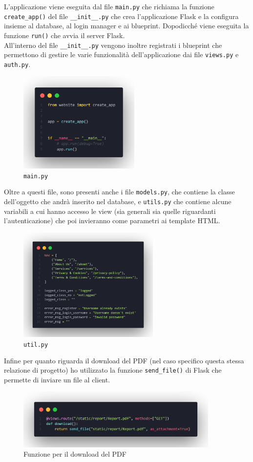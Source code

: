\documentclass[12pt]{article}
\def\code#1{\texttt{#1}}
\begin{document}
L'applicazione viene eseguita dal file \code{main.py} che richiama la funzione \code{create\_app()} del file \code{\_\_init\_\_.py} che crea l'applicazione Flask e la configura insieme al database, al login manager e ai blueprint. Dopodicché viene eseguita la funzione \code{run()} che avvia il server Flask. \\
All'interno del file \code{\_\_init\_\_.py} vengono inoltre registrati i blueprint che permettono di gestire le varie funzionalità dell'applicazione dai file \code{views.py} e \code{auth.py}.
\vskip 0.1cm
\begin{figure}[h]
    \includegraphics[width=6cm]{main.png}
    \centering
    \caption{\code{main.py}}
\end{figure}
\vskip 0.5cm
\noindent
Oltre a questi file, sono presenti anche i file \code{models.py}, che contiene la classe dell'oggetto che andrà inserito nel database, e \code{utils.py} che contiene alcune variabili a cui hanno accesso le view (sia generali sia quelle riguardanti l'autenticazione) che poi invieranno come parametri ai template HTML.
\vskip 0.1cm
\begin{figure}[h]
    \includegraphics[width=7cm]{util.png}
    \centering
    \caption{\code{util.py}}
\end{figure}
\vskip 0.5cm
\noindent
Infine per quanto riguarda il download del PDF (nel caso specifico questa stessa relazione di progetto) ho utilizzato la funzione \code{send\_file()} di Flask che permette di inviare un file al client.
\vskip 0.1cm
\begin{figure}[h]
    \includegraphics[width=10cm]{pdf.png}
    \centering
    \caption{Funzione per il download del PDF}
\end{figure}
\end{document}
